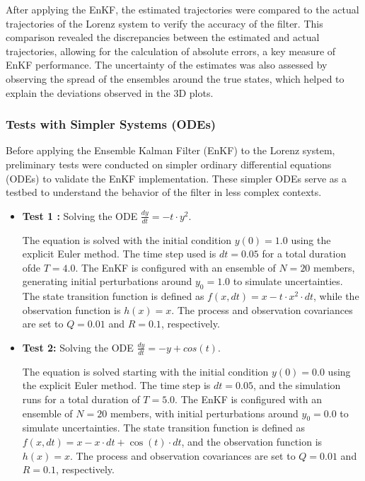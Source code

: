 \documentclass[a4paper,12pt,french]{article}
\begin{document}
After applying the EnKF, the estimated trajectories were 
compared to the actual trajectories of the Lorenz system to 
verify the accuracy of the filter. This comparison revealed 
the discrepancies between the estimated and actual trajectories, 
allowing for the calculation of absolute errors, 
a key measure of EnKF performance. 
The uncertainty of the estimates was also assessed 
by observing the spread of the ensembles around the true 
states, which helped to explain the deviations observed in the 3D plots.

\subsubsection{Tests with Simpler Systems (ODEs)}
Before applying the Ensemble Kalman Filter (EnKF) to the 
Lorenz system, preliminary tests were conducted on simpler 
ordinary differential equations (ODEs) to validate the EnKF implementation. These simpler ODEs serve as a testbed to understand the behavior of the filter in less complex contexts.
\begin{itemize}
  \item    \textbf{Test 1 :} Solving the ODE   $\frac{dy}{dt} = -t \cdot y^2$.

The equation is solved with the initial condition  
$y(0)=1.0$ using the explicit Euler method. The time step 
used is  $dt=0.05$ for a total duration ofde $T=4.0$.
The EnKF is configured with an ensemble of $N=20$ members, 
generating initial perturbations around $y_0=1.0$ 
to simulate uncertainties. The state transition function 
is defined as $f(x, dt) = x - t \cdot x^2 \cdot dt $, while the observation function is $h(x)=x$. The process and observation 
covariances are set to $Q=0.01$ and $R=0.1$, respectively.


\item     \textbf{Test 2:} Solving the ODE $\frac{dy}{dt} = -y + cos(t)$.

The equation is solved starting with the initial condition 
$y(0)=0.0$  using the explicit Euler method. The time step 
is $dt=0.05$, and the simulation runs for a total duration 
of $T=5.0$. The EnKF is configured with an ensemble of 
$N=20$ members, with initial perturbations around $y_0=0.0$ 
to simulate uncertainties. The state transition function 
is defined as $f(x, dt) = x - x \cdot dt + \cos(t) \cdot dt $, and the 
observation function is $h(x)=x$. The process and 
observation covariances are set to $Q=0.01$ and $R=0.1$, respectively.
\end{itemize}
\end{document}

